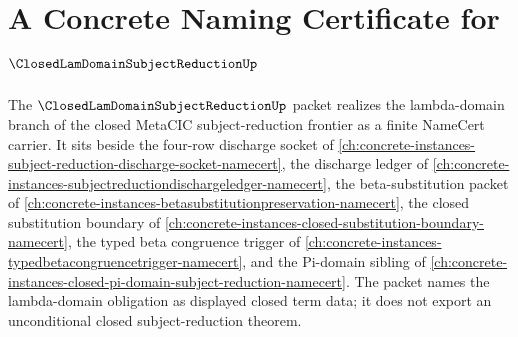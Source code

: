 \chapter{A Concrete Naming Certificate for $\ClosedLamDomainSubjectReductionUp$}
\label{ch:concrete-instances-closed-lam-domain-subject-reduction-namecert}

The $\ClosedLamDomainSubjectReductionUp$ packet realizes the lambda-domain branch of the closed MetaCIC subject-reduction frontier as a finite NameCert carrier. It sits beside the four-row discharge socket of \autoref{ch:concrete-instances-subject-reduction-discharge-socket-namecert}, the discharge ledger of \autoref{ch:concrete-instances-subjectreductiondischargeledger-namecert}, the beta-substitution packet of \autoref{ch:concrete-instances-betasubstitutionpreservation-namecert}, the closed substitution boundary of \autoref{ch:concrete-instances-closed-substitution-boundary-namecert}, the typed beta congruence trigger of \autoref{ch:concrete-instances-typedbetacongruencetrigger-namecert}, and the Pi-domain sibling of \autoref{ch:concrete-instances-closed-pi-domain-subject-reduction-namecert}. The packet names the lambda-domain obligation as displayed closed term data; it does not export an unconditional closed subject-reduction theorem.

